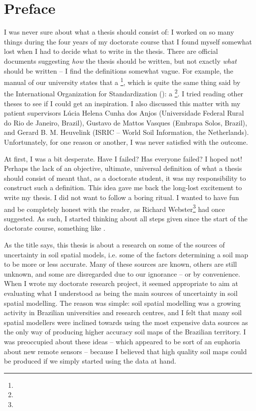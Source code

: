 \chapter*{Preface}

I was never sure about what a thesis should consist of: I worked on so many things during the four years of 
my doctorate course that I found myself somewhat lost when I had to decide what to write in the thesis. There 
are official documents suggesting \emph{how} the thesis should be written, but not exactly \emph{what} should 
be written -- I find the definitions somewhat vague. For example, the manual of our university states that a 
\footnote{}, which is quite the same thing said by the 
International Organization for Standardization (\iso): a \footnote{}. I tried reading other theses to see if I could get an 
inspiration. I also discussed this matter with my patient supervisors Lúcia Helena Cunha dos Anjos 
(Universidade Federal Rural do Rio de Janeiro, Brazil), Gustavo de Mattos Vasques (Embrapa Solos, Brazil), and 
Gerard B. M. Heuvelink (ISRIC -- World Soil Information, the Netherlands). Unfortunately, for one reason or 
another, I was never satisfied with the outcome.

At first, I was a bit desperate. Have I failed? Has everyone failed? I hoped not! Perhaps the lack of an 
objective, ultimate, universal definition of what a thesis should consist of meant that, as a doctorate 
student, it was my responsibility to construct such a definition. This idea gave me back the long-lost 
excitement to write my thesis. I did not want to follow a boring ritual. I wanted to have fun and be 
completely honest with the reader, as Richard Webster\footnote{} had once suggested. 
As such, I started thinking about all steps given since the start of the doctorate course, something like 
.

As the title says, this thesis is about a research on some of the sources of uncertainty in soil spatial 
models, i.e. some of the factors determining a soil map to be more or less accurate. Many of these sources are 
known, others are still unknown, and some are disregarded due to our ignorance -- or by convenience. When I 
wrote my doctorate research project, it seemed appropriate to aim at evaluating what I understood as being the 
main sources of uncertainty in soil spatial modelling. The reason was simple: soil spatial modelling was a 
growing activity in Brazilian universities and research centres, and I felt that many soil spatial modellers 
were inclined towards using the most expensive data sources as the only way of producing higher accuracy soil 
maps of the Brazilian territory. I was preoccupied about these ideas -- which appeared to be sort of an 
euphoria about new remote sensors -- because I believed that high quality soil maps could be produced if we 
simply started using the data at hand.

